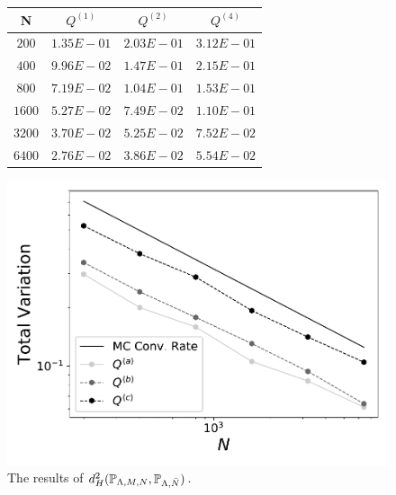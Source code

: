 \begin{figure}
\begin{minipage}{.5\textwidth}
\begin{table}[H]
\begin{tabular}{ c | c | c | c }
N & $Q^{(1)}$ & $Q^{(2)}$ & $Q^{(4)}$\\ \hline \hline
$200$ & $1.35E-01$ & $2.03E-01$ & $3.12E-01$\\ \hline

$400$ & $9.96E-02$ & $1.47E-01$ & $2.15E-01$\\ \hline

$800$ & $7.19E-02$ & $1.04E-01$ & $1.53E-01$\\ \hline

$1600$ & $5.27E-02$ & $7.49E-02$ & $1.10E-01$\\ \hline

$3200$ & $3.70E-02$ & $5.25E-02$ & $7.52E-02$\\ \hline

$6400$ & $2.76E-02$ & $3.86E-02$ & $5.54E-02$\\ \hline
\end{tabular}
\end{table}
\end{minipage}
\begin{minipage}{.45\textwidth}
		\includegraphics[width=\linewidth]{./images/Plot-reg_BigN_40000_reg_M_1_rand_I_100000}
\end{minipage}
\caption{The results of $d^2_H(\mathbb{P}_{{\Lambda}, M, N}, \mathbb{P}_{{\Lambda},\bar{N}})$.}
\label{fig:M1_2d}
\end{figure}

